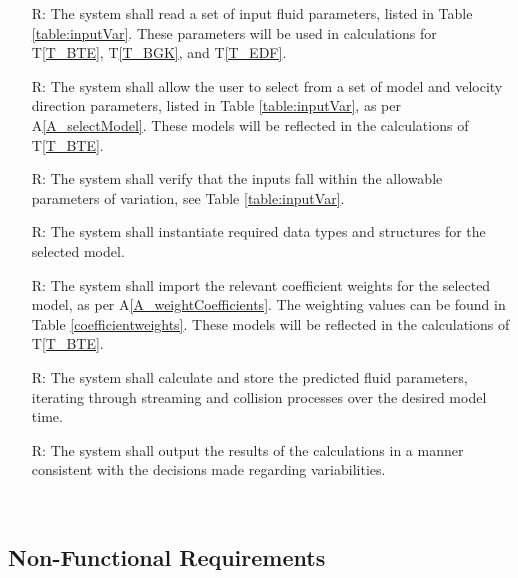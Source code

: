 \documentclass[12pt]{article}
\newcommand{\tref}[1]{T\ref{#1}}
\newcounter{reqnum} %
\begin{document}
\noindent \begin{itemize}

\item[R\refstepcounter{reqnum}\thereqnum \label{R_Inputs}:] The system shall read a set of input fluid parameters, listed in Table \ref{table:inputVar}. These parameters will be used in calculations for \tref{T_BTE}, \tref{T_BGK}, and \tref{T_EDF}.

\item[R\refstepcounter{reqnum}\thereqnum \label{R_ModelInputs}:] The system shall allow the user to select from a set of model and velocity direction parameters, listed in Table \ref{table:inputVar}, as per A\ref{A_selectModel}. These models will be reflected in the calculations of \tref{T_BTE}.

\item[R\refstepcounter{reqnum}\thereqnum \label{R_CheckInputs}:] The system shall verify that the inputs fall within the allowable parameters of variation, see Table \ref{table:inputVar}.

\item[R\refstepcounter{reqnum}\thereqnum \label{R_Instantiate}:] The system shall instantiate required data types and structures for the selected model.

\item[R\refstepcounter{reqnum}\thereqnum \label{R_CoefficientWeights}:] The system shall import the relevant coefficient weights for the selected model, as per A\ref{A_weightCoefficients}. The weighting values can be found in Table \ref{coefficientweights}. These models will be reflected in the calculations of \tref{T_BTE}.

\item[R\refstepcounter{reqnum}\thereqnum \label{R_Calculate}:] The system shall calculate and store the predicted fluid parameters, iterating through streaming and collision processes over the desired model time.

\item[R\refstepcounter{reqnum}\thereqnum \label{R_Output}:] The system shall output the results of the calculations in a manner consistent with the decisions made regarding variabilities.

\end{itemize}

~\newpage

\subsection{Non-Functional Requirements}
\end{document}
